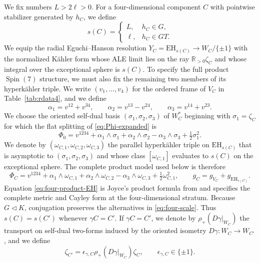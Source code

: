 \documentclass[11pt]{article}
\theoremstyle{remark}\newtheorem{remark}[theorem]{Remark}
\newcommand{\SpinSeven}{\operatorname{Spin}(7)}
\newcommand{\EH}{\mathrm{EH}}
\newcommand{\R}{\mathbb R}
\begin{document}
We fix numbers $L>2\ell>0$.  For a four-dimensional component $C$ with
pointwise stabilizer generated by $h_C$, we define
\begin{equation}\label{eq:four-scale}
s(C)=\begin{cases}L,&h_C\in G,\\ \ell,&h_C\in GT.\end{cases}
\end{equation}
We equip the radial Eguchi--Hanson resolution
$Y_C=\EH_{s(C)}\to W_C/\{\pm1\}$ with the normalized K\"ahler form whose
ALE limit lies on the ray $\R_{>0}\zeta_C$ and whose integral over the
exceptional sphere is $s(C)$.  To specify the full product $\SpinSeven$
structure, we must also fix the remaining two members of its hyperk\"ahler
triple.  We write $(v_1,\ldots,v_4)$ for the ordered frame of $V_C$ in
Table~\ref{tab:rdata4}, and we define
\[
 \alpha_1=v^{12}+v^{34},\qquad
 \alpha_2=v^{13}-v^{24},\qquad
 \alpha_3=v^{14}+v^{23}.
\]
We choose the oriented self-dual basis
$(\sigma_1,\sigma_2,\sigma_3)$ of $W_C^*$ beginning with
$\sigma_1=\zeta_C$ for which the flat splitting of
\eqref{eq:Phi-expanded} is
\begin{equation}\label{eq:four-product-flat}
 \Phi_0=v^{1234}+\alpha_1\wedge\sigma_1
       +\alpha_2\wedge\sigma_2-\alpha_3\wedge\sigma_3
       +\tfrac12\sigma_1^2.
\end{equation}
We denote by $(\omega_{C,1},\omega_{C,2},\omega_{C,3})$ the parallel
hyperk\"ahler triple on $\EH_{s(C)}$ that is asymptotic to
$(\sigma_1,\sigma_2,\sigma_3)$ and whose class
$[\omega_{C,1}]$ evaluates to $s(C)$ on the exceptional sphere.  The
complete product model used below is therefore
\begin{equation}\label{eq:four-product-EH}
 \Phi_C=v^{1234}+\alpha_1\wedge\omega_{C,1}
       +\alpha_2\wedge\omega_{C,2}-\alpha_3\wedge\omega_{C,3}
       +\tfrac12\omega_{C,1}^2,
 \qquad g_C=g_{V_C}+g_{\EH_{s(C)}}.
\end{equation}
Equation \eqref{eq:four-product-EH} is Joyce's product formula from
\cite[Proposition 13.1.1]{JoyceBook} and specifies the complete metric and
Cayley form at the four-dimensional stratum.
Because $G\triangleleft K$, conjugation preserves the alternatives in
\eqref{eq:four-scale}.  Thus $s(C)=s(C')$ whenever $\gamma C=C'$.  If
$\gamma C=C'$, we denote by $\rho_+(D\gamma|_{W_C})$ the transport on
self-dual two-forms induced by the oriented isometry
$D\gamma:W_C\to W_{C'}$, and we define
\begin{equation}\label{eq:epsilon}
\zeta_{C'}=\epsilon_{\gamma,C}\rho_+(D\gamma|_{W_C})\zeta_C,
\qquad \epsilon_{\gamma,C}\in\{\pm1\}.
\end{equation}
\end{document}
